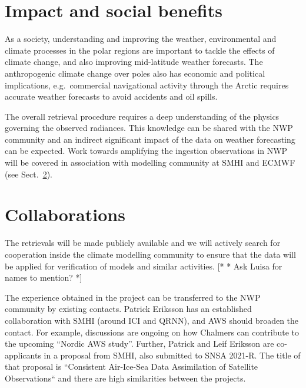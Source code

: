 \documentclass[12pt,oneside,a4paper]{article}
\newcommand\intodo[1]{{\color{red} [* #1 *]}}
\begin{document}
\section{Impact and social benefits}
%
\label{sec:impact}

As a society, understanding and improving the weather, environmental and
climate processes in the polar regions are important to tackle the effects
of climate change, and also improving mid-latitude weather forecasts. The
anthropogenic climate change over poles also has economic and political
implications, e.g.\ commercial navigational activity through the Arctic
requires accurate weather forecasts to avoid accidents and oil spills.

The overall retrieval procedure requires a deep understanding of the physics
governing the observed radiances. This knowledge can be shared with the NWP
community and an indirect significant impact of the data on weather forecasting
can be expected. Work towards amplifying the ingestion observations in NWP will
be covered in association with modelling community at SMHI and ECMWF (see
Sect.~\ref{sec:collaborations}).

\newpage



\section{Collaborations}
%
\label{sec:collaborations}
The retrievals will be made publicly available and we will actively search
for cooperation inside the climate modelling community to ensure that the 
data will be applied for verification of models and similar activities. \intodo{* Ask
Luisa for names to mention?}

The experience obtained in the project can be transferred to the NWP community
by existing contacts. Patrick Eriksson has an established collaboration with
SMHI (around ICI and QRNN), and AWS should broaden the contact. For example,
discussions are ongoing on how Chalmers can contribute to the upcoming
``Nordic AWS study''. Further, Patrick and Leif Eriksson are co-applicants in a
proposal from SMHI, also submitted to SNSA 2021-R. The title of that proposal
is ``Consistent Air-Ice-Sea Data Assimilation of Satellite Observations`` and
there are high similarities between the projects.
\end{document}
